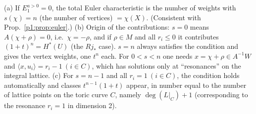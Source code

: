 \begin{cor}\tP
(a) If $E_1^{a>0}=0$, the total Euler characteristic is the number of weights with $s(\chi)=n$ (the number of vertices) $=\chi(X)$. (Consistent with Prop.~\ref{p1:prop:euler}.) (b) Origin of the contributions: $s=0$ means $A(\chi+\rho)=0$, i.e.\ $\chi=-\rho$, and if $\rho\in M$ and all $r_i\le0$ it contributes $(1+t)^n=H^*(U)$ (the $Rj_*$ case). $s=n$ always satisfies the condition and gives the vertex weights, one $t^n$ each. For $0<s<n$ one needs $x=\chi+\rho\in A^{-1}W$ and $\langle x,u_i\rangle=r_i-1\ (i\in C)$, which has solutions only at ``resonances'' on the integral lattice. (c) For $s=n-1$ and all $r_i=1\ (i\in C)$, the condition holds automatically and classes $t^{n-1}(1+t)$ appear, in number equal to the number of lattice points on the toric curve $C$, namely $\deg(L|_C)+1$ (corresponding to the resonance $r_i=1$ in dimension 2).
\end{cor}

